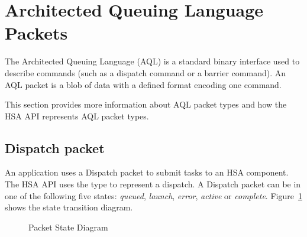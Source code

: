 \documentclass[final]{book}
\begin{document}
\section{Architected Queuing Language Packets}\label{sec:aql}
The Architected Queuing Language (AQL) is a standard binary interface used to
describe commands (such as a dispatch command or a barrier command). An AQL
packet is a blob of data with a defined format encoding one command.

This section provides more information about AQL packet types and how the HSA
API represents AQL packet types.

\subsection{Dispatch packet}\label{dispatch-packet}

An application uses a Dispatch packet to submit tasks to an HSA component. The
HSA API uses the  type to represent a dispatch.
A Dispatch packet can be in one of the following five states: \emph{queued},
\emph{launch}, \emph{error}, \emph{active} or
\emph{complete}. Figure~\ref{fig:packetstate} shows the state transition
diagram.

\begin{figure}[b]
  \centering
  \scriptsize
{}
  \centering
  \caption{Packet State Diagram}
  \label{fig:packetstate}
\end{figure}
\end{document}
